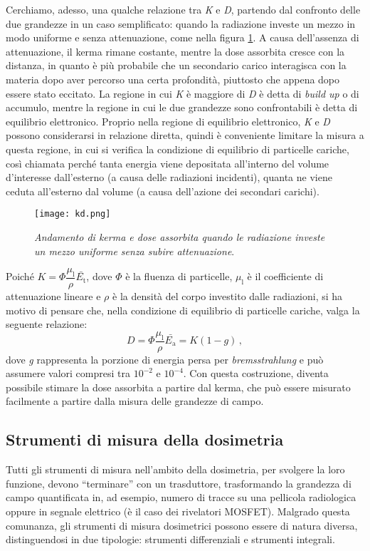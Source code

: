 \documentclass{report}
\newcommand{\virgolette}[1]{``#1''}
\newcommand{\figref}[1]{figura \ref{#1}}
\numberwithin{equation}{section}
\numberwithin{figure}{section}
\begin{document}
Cerchiamo, adesso, una qualche relazione tra \textit{K} e \textit{D}, partendo dal confronto delle due grandezze in un caso semplificato: quando la radiazione investe un mezzo in modo uniforme e senza attenuazione, come nella \figref{fig:kd}. A causa dell'assenza di attenuazione, il kerma rimane costante, mentre la dose assorbita cresce con la distanza, in quanto è più probabile che un secondario carico interagisca con la materia dopo aver percorso una certa profondità, piuttosto che appena dopo essere stato eccitato. La regione in cui \textit{K} è maggiore di \textit{D} è detta di \textit{build up} o di accumulo, mentre la regione in cui le due grandezze sono confrontabili è detta di equilibrio elettronico. Proprio nella regione di equilibrio elettronico, \textit{K} e \textit{D} possono considerarsi in relazione diretta, quindi è conveniente limitare la misura a questa regione, in cui si verifica la condizione di equilibrio di particelle cariche, così chiamata perché tanta energia viene depositata all'interno del volume d'interesse dall'esterno (a causa delle radiazioni incidenti), quanta ne viene ceduta all'esterno dal volume (a causa dell'azione dei secondari carichi).

\begin{figure}[htp]
\centering
\texttt{[image: kd.png]}
\caption{\label{fig:kd} \textit{Andamento di kerma e dose assorbita quando le radiazione investe un mezzo uniforme senza subire attenuazione}.}
\end{figure}

\noindent Poiché $K = \Phi \dfrac{\mu_\mathrm{l}}{\rho} \bar{E_\mathrm{t}}$, dove $\Phi$ è la fluenza di particelle, $\mu_\mathrm{l}$ è il coefficiente di attenuazione lineare e $\rho$ è la densità del corpo investito dalle radiazioni, si ha motivo di pensare che, nella condizione di equilibrio di particelle cariche, valga la seguente relazione:
\begin{equation}
    D = \Phi \dfrac{\mu_\mathrm{l}}{\rho} \bar{E_\mathrm{a}} = K(1-g)\,,
\end{equation}
dove \textit{g} rappresenta la porzione di energia persa per \textit{bremsstrahlung} e può assumere valori compresi tra $10^{-2}$ e $10^{-4}$. Con questa costruzione, diventa possibile stimare la dose assorbita a partire dal kerma, che può essere misurato facilmente a partire dalla misura delle grandezze di campo.

\subsection{Strumenti di misura della dosimetria}
Tutti gli strumenti di misura nell'ambito della dosimetria, per svolgere la loro funzione, devono \virgolette{terminare} con un trasduttore, trasformando la grandezza di campo quantificata in, ad esempio, numero di tracce su una pellicola radiologica oppure in segnale elettrico (è il caso dei rivelatori MOSFET). Malgrado questa comunanza, gli strumenti di misura dosimetrici possono essere di natura diversa, distinguendosi in due tipologie: strumenti differenziali e strumenti integrali.
\end{document}
